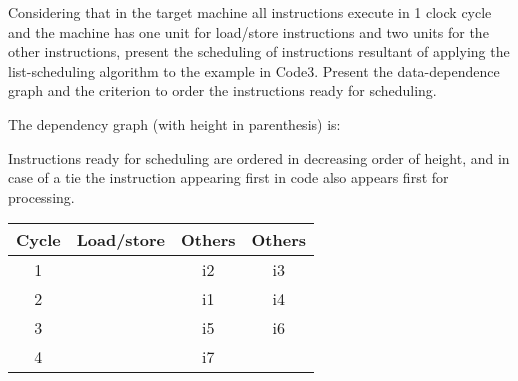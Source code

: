 \documentclass[docid=2020]{comp_test2}
\begin{document}
\question
Considering that in the target machine all instructions execute in 1 clock cycle and the machine has one unit for load/store instructions and two units for the other instructions, present the scheduling of instructions resultant of applying the list-scheduling algorithm to the example in Code3. Present the data-dependence graph and the criterion to order the instructions ready for scheduling.

\ansseparator

The dependency graph (with height in parenthesis) is:

\begin{center}
\end{center}

Instructions ready for scheduling are ordered in decreasing order of height, and in case of a tie the instruction appearing first in code also appears first for processing.

\begin{center}
    \begin{tabular}{c || c | c | c}
        \textbf{Cycle} & \textbf{Load/store} & \textbf{Others} & \textbf{Others} \\ \hline
        1              &                     & i2              & i3              \\
        2              &                     & i1              & i4              \\
        3              &                     & i5              & i6              \\
        4              &                     & i7              &                
    \end{tabular}
\end{center}
\end{document}
